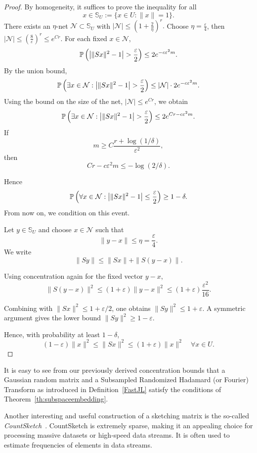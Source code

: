 \begin{proof}
By homogeneity, it suffices to prove the inequality for all
$$
x \in \mathbb{S}_U := \{x \in U : \|x\| = 1\}.
$$
There exists an $\eta$-net $\mathcal{N} \subset \mathbb{S}_U$ with
$
|\mathcal{N}| \le \left(1+\frac{2}{\eta}\right)^r.
$
Choose $\eta = \frac{\varepsilon}{4}$, then
$
|\mathcal{N}| \le \left(\frac{8}{\varepsilon}\right)^r
 \le
e^{C r}.
$
For each fixed $x \in \mathcal{N}$,
$$
\P \left(
\bigl| \|Sx\|^2 - 1 \bigr| > \frac{\varepsilon}{2}
\right)
 \le
2 e^{-c \varepsilon^2 m}.
$$
By the union bound,
$$
\P \left(
\exists x \in \mathcal{N} :
\bigl| \|Sx\|^2 - 1 \bigr| > \frac{\varepsilon}{2}
\right)
\le
|\mathcal{N}| \cdot 2 e^{-c \varepsilon^2 m}.
$$
Using the bound on the size of the net, $|\mathcal{N}| \le e^{C r}$,
we obtain
$$
\P \left(\exists x \in \mathcal{N} :
\bigl| \|Sx\|^2 - 1 \bigr| > \frac{\varepsilon}{2} \right)
\le 2 e^{ C r - c \varepsilon^2 m }.
$$
If
$$
m \ge C \frac{r + \log(1/\delta)}{\varepsilon^2},
$$
then
$$
Cr - c \varepsilon^2 m \le -\log(2/\delta).
$$

Hence
$$
\P \left(
\forall x \in \mathcal{N} :
\bigl| \|Sx\|^2 - 1 \bigr| \le \frac{\varepsilon}{2}
\right)
\ge 1-\delta.
$$
From now on, we condition on this event.

Let $y \in \mathbb{S}_U$ and choose $x \in \mathcal{N}$ such that
$$
\|y - x\| \le \eta = \frac{\varepsilon}{4}.
$$
We write
$$
\|Sy\|
\le
\|Sx\| + \|S(y-x)\|.
$$

Using concentration again for the fixed vector $y-x$,
$$
\|S(y-x)\|^2
\le
(1+\varepsilon)\|y-x\|^2
\le
(1+\varepsilon)\frac{\varepsilon^2}{16}.
$$

Combining with $\|Sx\|^2 \le 1+\varepsilon/2$, one obtains
$\|Sy\|^2 \le 1+\varepsilon$.
A symmetric argument gives the lower bound
$\|Sy\|^2 \ge 1-\varepsilon$.

Hence, with probability at least $1-\delta$,
$$
(1-\varepsilon)\|x\|^2
\le
\|Sx\|^2
\le
(1+\varepsilon)\|x\|^2
\quad \forall x \in U.
$$
 
\end{proof}

It is easy to see from our previously derived concentration bounds that a Gaussian random matrix and a Subsampled Randomized Hadamard (or Fourier) Transform as introduced in Definition~\ref{FastJL}
satisfy the conditions of Theorem~\ref{th:subspaceembedding}.

Another interesting and useful construction of a sketching matrix is the so-called {\em CountSketch}~\cite{charikar2002finding,thorup2012tabulation}. CountSketch is extremely sparse, making it an appealing choice for processing massive datasets or high-speed data streams. It is often used to estimate frequencies of elements in data streams.

